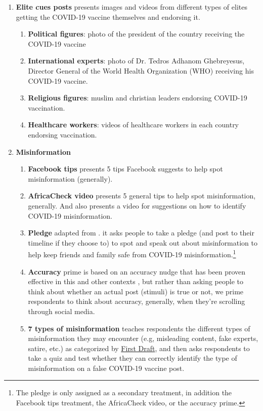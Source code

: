 \documentclass[letterpaper, 12pt, parskip=full,DIV=10]{scrartcl}
\begin{document}
\begin{enumerate}
  \item \textbf{Elite cues posts} presents images and videos from different types of elites getting the COVID-19 vaccine themselves and endorsing it. 
  \begin{enumerate}[noitemsep, topsep=0pt]
    \item \textbf{Political figures}: photo of the president of the country receiving the COVID-19 vaccine
    \item \textbf{International experts}: photo of Dr. Tedros Adhanom Ghebreyesus, Director General of the World Health Organization (WHO) receiving his COVID-19 vaccine.
    \item \textbf{Religious figures}: muslim and christian leaders endorsing COVID-19 vaccination.
    \item \textbf{Healthcare workers}: videos of healthcare workers in each country endorsing vaccination.
  \end{enumerate}
  \item \textbf{Misinformation}
    \begin{enumerate}[noitemsep, topsep=0pt]
    \item \textbf{Facebook tips} presents 5 tips Facebook suggests to help spot misinformation (generally).
    \item \textbf{AfricaCheck video} presents 5 general tips to help spot misinformation, generally. And also presents a video for suggestions on how to identify COVID-19 misinformation.
    \item \textbf{Pledge} adapted from \cite{offer-westort2021optimal}. it asks people to take a pledge (and post to their timeline if they choose to) to spot and speak out about misinformation to help keep friends and family safe from COVID-19 misinformation.\footnote{The pledge is only assigned as a secondary treatment, in addition the Facebook tips treatment, the AfricaCheck video, or the accuracy prime. }
    \item \textbf{Accuracy} prime is based on an accuracy nudge that has been proven effective in this and other contexts \citep{pennycook2020fighting, offer-westort2021optimal}, but rather than asking people to think about whether an actual post (stimuli) is true or not, we prime respondents to think about accuracy, generally, when they're scrolling through social media.
    \item \textbf{7 types of misinformation} teaches respondents the different types of misinformation they may encounter (e.g, misleading content, fake experts, satire, etc.) as categorized by \href{https://firstdraftnews.org/}{First Draft}, and then asks respondents to take a quiz and test whether they can correctly identify the type of misinformation on a false COVID-19 vaccine post. 

\end{enumerate}
\end{enumerate}
\end{document}
